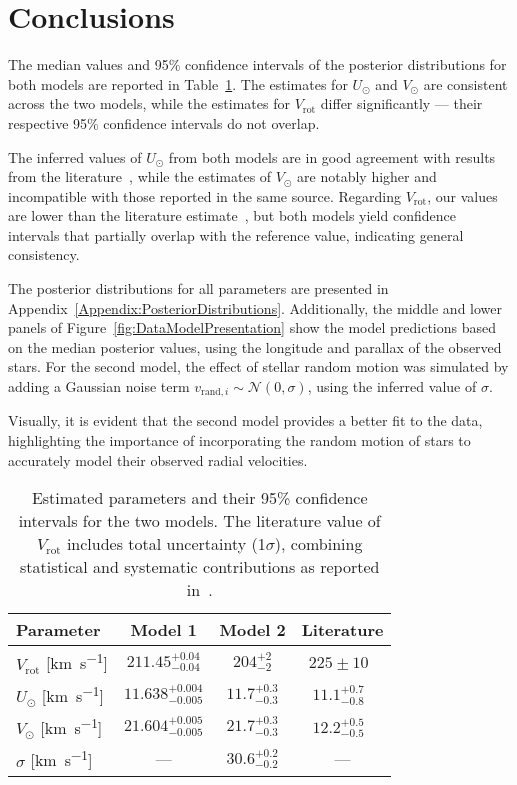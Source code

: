\section{Conclusions}

The median values and 95\% confidence intervals of the posterior distributions for both models are reported in Table~\ref{tab:parameter_estimates}. The estimates for $U_\odot$ and $V_\odot$ are consistent across the two models, while the estimates for $V_{\text{rot}}$ differ significantly — their respective 95\% confidence intervals do not overlap.

The inferred values of $U_\odot$ from both models are in good agreement with results from the literature~\cite{LocalKinematics}, while the estimates of $V_\odot$ are notably higher and incompatible with those reported in the same source. Regarding $V_{\text{rot}}$, our values are lower than the literature estimate~\cite{GalacticKinematics}, but both models yield confidence intervals that partially overlap with the reference value, indicating general consistency.

The posterior distributions for all parameters are presented in Appendix~\ref{Appendix:PosteriorDistributions}. Additionally, the middle and lower panels of Figure~\ref{fig:DataModelPresentation} show the model predictions based on the median posterior values, using the longitude and parallax of the observed stars. For the second model, the effect of stellar random motion was simulated by adding a Gaussian noise term $v_{\text{rand}, i} \sim \mathcal{N}(0, \sigma)$, using the inferred value of $\sigma$.

Visually, it is evident that the second model provides a better fit to the data, highlighting the importance of incorporating the random motion of stars to accurately model their observed radial velocities.

\begin{table}[H]
    \centering
    \begin{tabular}{l c c | c}
        \hline
        Parameter & Model 1 & Model 2 & Literature \\
        \hline
        $V_{\text{rot}}$ [\unit{\kilo\meter\per\second}] & $211.45^{+0.04}_{-0.04}$ & $204^{+2}_{-2}$ & $225 \pm 10$~\cite{GalacticKinematics} \\
        $U_{\odot}$ [\unit{\kilo\meter\per\second}] & $11.638^{+0.004}_{-0.005}$ & $11.7^{+0.3}_{-0.3}$ & $11.1^{+0.7}_{-0.8}$~\cite{LocalKinematics} \\
        $V_{\odot}$ [\unit{\kilo\meter\per\second}] & $21.604^{+0.005}_{-0.005}$ & $21.7^{+0.3}_{-0.3}$ & $12.2^{+0.5}_{-0.5}$~\cite{LocalKinematics} \\
        $\sigma$ [\unit{\kilo\meter\per\second}] & --- & $30.6^{+0.2}_{-0.2}$ & --- \\
        \hline
    \end{tabular}
    \caption{Estimated parameters and their 95\% confidence intervals for the two models. The literature value of $V_{\text{rot}}$ includes total uncertainty (1$\sigma$), combining statistical and systematic contributions as reported in~\cite{GalacticKinematics}.}
    \label{tab:parameter_estimates}
\end{table}
